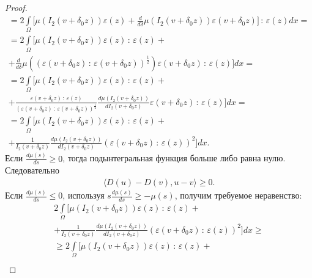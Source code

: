 \documentclass[14pt, a4paper]{extarticle}
\numberwithin{equation}{section}
\begin{document}
\begin{proof}
\begin{equation*}
\begin{gathered}
                = 2\int\limits_\Omega \bigg[ \mu(I_2(v+\delta_0 z))\varepsilon(z) + \frac{d}{d\delta} \mu(I_2(v+\delta_0 z))\varepsilon(v+\delta_0 z) \bigg]\, : \,\varepsilon(z)dx =\\
                = 2\int\limits_\Omega \bigg[ \mu(I_2(v+\delta_0 z))\varepsilon(z)\, : \,\varepsilon(z) + \\
                + \frac{d}{d\delta} \mu ((\varepsilon(v+\delta_0 z)\, : \,\varepsilon(v+\delta_0 z))^\frac{1}{2})\varepsilon(v+\delta_0 z) \, : \,\varepsilon(z) \bigg] dx=\\
                = 2\int\limits_\Omega \bigg[ \mu(I_2(v+\delta_0 z))\varepsilon(z)\, : \,\varepsilon(z) + \\
                + \frac{\varepsilon(v+\delta_0 z)\, : \,\varepsilon(z)}{(\varepsilon(v+\delta_0 z)\, : \,\varepsilon(v+\delta_0 z))^{\frac{1}{2}}}
                \frac{d\mu(I_2(v+\delta_0 z))}{dI_2(v+\delta_0 z)} \varepsilon(v+\delta_0 z)\, : \,\varepsilon(z) \bigg] dx =\\
                = 2\int\limits_\Omega \bigg[ \mu(I_2(v+\delta_0 z))\varepsilon(z)\, : \,\varepsilon(z) + \\
                + \frac{1}{I_2(v+\delta_0 z)} \frac{d\mu(I_2(v+\delta_0 z))}{dI_2(v+\delta_0 z)} (\varepsilon(v+\delta_0 z)\, : \,\varepsilon(z))^2 \bigg] dx.
            \end{gathered}
        \end{equation*}
        Если $\frac{d\mu(s)}{ds} \geq 0$, тогда подынтегральная функция больше либо равна нулю. Следовательно
        \begin{equation*}
            \begin{gathered}
                \langle D(u) - D(v), u-v \rangle \geq 0.
            \end{gathered}
        \end{equation*}
        Если $\frac{d\mu(s)}{ds} \leq 0$, используя $s \frac{d\mu(s)}{ds} \geq -\mu(s)$, получим требуемое неравенство:
        \begin{equation*}
            \begin{gathered}
                2\int\limits_\Omega \bigg[ \mu(I_2(v+\delta_0 z))\varepsilon(z)\, : \,\varepsilon(z) + \\
                + \frac{1}{I_2(v+\delta_0 z)} \frac{d\mu(I_2(v+\delta_0 z))}{dI_2(v+\delta_0 z)} (\varepsilon(v+\delta_0 z)\, : \,\varepsilon(z))^2 \bigg] dx \geq \\
                \geq 2\int\limits_\Omega \bigg[ \mu(I_2(v+\delta_0 z))\varepsilon(z)\, : \,\varepsilon(z) + \\

\end{gathered}
\end{equation*}
\end{proof}
\end{document}
